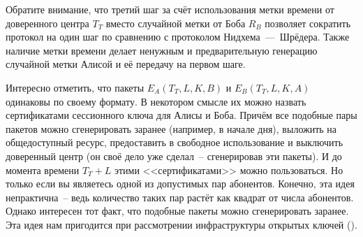 Обратите внимание, что третий шаг за счёт использования метки времени от доверенного центра $T_T$ вместо случайной метки от Боба $R_B$ позволяет сократить протокол на один шаг по сравнению с протоколом Нидхема~---~Шрёдера. Также наличие метки времени делает ненужным и предварительную генерацию случайной метки Алисой и её передачу на первом шаге.

Интересно отметить, что пакеты $E_A \left( T_T, L, K, B \right)$ и $E_B \left( T_T, L, K, A \right)$ одинаковы по своему формату. В некотором смысле их можно назвать сертификатами сессионного ключа для Алисы и Боба. Причём все подобные пары пакетов можно сгенерировать заранее (например, в начале дня), выложить на общедоступный ресурс, предоставить в свободное использование и выключить доверенный центр (он своё дело уже сделал~-- сгенерировав эти пакеты). И до момента времени $T_T + L$ этими <<сертификатами>> можно пользоваться. Но только если вы являетесь одной из допустимых пар абонентов. Конечно, эта идея непрактична~-- ведь количество таких пар растёт как квадрат от числа абонентов. Однако интересен тот факт, что подобные пакеты можно сгенерировать заранее. Эта идея нам пригодится при рассмотрении инфраструктуры открытых ключей ().

